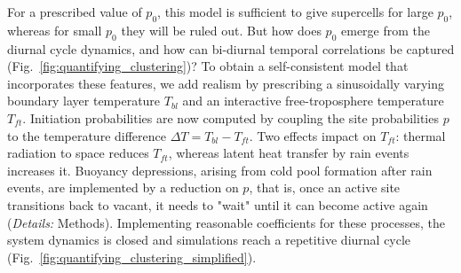 \documentclass[draft,linenumbers]{agujournal2019}
\begin{document}
For a prescribed value of $p_0$, this model is sufficient to give supercells for large $p_0$, whereas for small $p_0$ they will be ruled out. 
But how does $p_0$ emerge from the diurnal cycle dynamics, and how can bi-diurnal temporal correlations be captured (Fig.~\ref{fig:quantifying_clustering})?
To obtain a self-consistent model that incorporates these features, we add realism by prescribing a sinusoidally varying boundary layer temperature $T_{bl}$ and an interactive free-troposphere temperature $T_{ft}$.
Initiation probabilities are now computed by coupling the site probabilities $p$ to the temperature difference $\Delta T=T_{bl}-T_{ft}$.
Two effects impact on $T_{ft}$: 
thermal radiation to space reduces $T_{ft}$, whereas latent heat transfer by rain events increases it.
Buoyancy depressions, arising from cold pool formation after rain events, are implemented by a reduction on $p$, that is, once an active site transitions back to vacant, it needs to "wait" until it can become active again 
({\it Details:} Methods).
Implementing reasonable coefficients for these processes, the system dynamics is closed and simulations reach a repetitive diurnal cycle (Fig.~\ref{fig:quantifying_clustering_simplified}).
\end{document}
